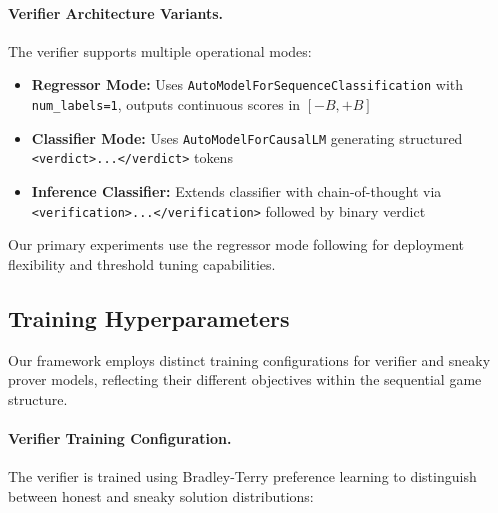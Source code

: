 \paragraph{Verifier Architecture Variants.} The verifier supports multiple operational modes:
\begin{itemize}
    \item \textbf{Regressor Mode:} Uses \texttt{AutoModelForSequenceClassification} with \texttt{num\_labels=1}, outputs continuous scores in $[-B, +B]$
    \item \textbf{Classifier Mode:} Uses \texttt{AutoModelForCausalLM} generating structured \texttt{<verdict>...</verdict>} tokens
    \item \textbf{Inference Classifier:} Extends classifier with chain-of-thought via \texttt{<verification>...</verification>} followed by binary verdict
\end{itemize}

Our primary experiments use the regressor mode following \citet{kirchner2024prover} for deployment flexibility and threshold tuning capabilities.

\subsection{Training Hyperparameters}
\label{sec:training_hyperparams}

Our framework employs distinct training configurations for verifier and sneaky prover models, reflecting their different objectives within the sequential game structure.

\paragraph{Verifier Training Configuration.} The verifier is trained using Bradley-Terry preference learning to distinguish between honest and sneaky solution distributions:

